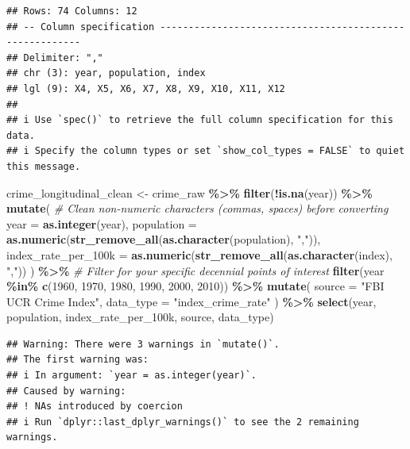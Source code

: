\documentclass[
]{article}
\newenvironment{Shaded}{\begin{snugshade}}{\end{snugshade}}
\newcommand{\AttributeTok}[1]{\textcolor[rgb]{0.13,0.29,0.53}{#1}}
\newcommand{\CommentTok}[1]{\textcolor[rgb]{0.56,0.35,0.01}{\textit{#1}}}
\newcommand{\DecValTok}[1]{\textcolor[rgb]{0.00,0.00,0.81}{#1}}
\newcommand{\FunctionTok}[1]{\textcolor[rgb]{0.13,0.29,0.53}{\textbf{#1}}}
\newcommand{\NormalTok}[1]{#1}
\newcommand{\OtherTok}[1]{\textcolor[rgb]{0.56,0.35,0.01}{#1}}
\newcommand{\SpecialCharTok}[1]{\textcolor[rgb]{0.81,0.36,0.00}{\textbf{#1}}}
\newcommand{\StringTok}[1]{\textcolor[rgb]{0.31,0.60,0.02}{#1}}
\begin{document}
\begin{verbatim}
## Rows: 74 Columns: 12
## -- Column specification --------------------------------------------------------
## Delimiter: ","
## chr (3): year, population, index
## lgl (9): X4, X5, X6, X7, X8, X9, X10, X11, X12
## 
## i Use `spec()` to retrieve the full column specification for this data.
## i Specify the column types or set `show_col_types = FALSE` to quiet this message.
\end{verbatim}

\begin{Shaded}
\begin{Highlighting}[]
\NormalTok{crime\_longitudinal\_clean }\OtherTok{\textless{}{-}}\NormalTok{ crime\_raw }\SpecialCharTok{\%\textgreater{}\%}
  \FunctionTok{filter}\NormalTok{(}\SpecialCharTok{!}\FunctionTok{is.na}\NormalTok{(year)) }\SpecialCharTok{\%\textgreater{}\%}
  \FunctionTok{mutate}\NormalTok{(}
    \CommentTok{\# Clean non{-}numeric characters (commas, spaces) before converting}
    \AttributeTok{year =} \FunctionTok{as.integer}\NormalTok{(year),}
    \AttributeTok{population =} \FunctionTok{as.numeric}\NormalTok{(}\FunctionTok{str\_remove\_all}\NormalTok{(}\FunctionTok{as.character}\NormalTok{(population), }\StringTok{","}\NormalTok{)),}
    \AttributeTok{index\_rate\_per\_100k =} \FunctionTok{as.numeric}\NormalTok{(}\FunctionTok{str\_remove\_all}\NormalTok{(}\FunctionTok{as.character}\NormalTok{(index), }\StringTok{","}\NormalTok{))}
\NormalTok{  ) }\SpecialCharTok{\%\textgreater{}\%}
  \CommentTok{\# Filter for your specific decennial points of interest}
  \FunctionTok{filter}\NormalTok{(year }\SpecialCharTok{\%in\%} \FunctionTok{c}\NormalTok{(}\DecValTok{1960}\NormalTok{, }\DecValTok{1970}\NormalTok{, }\DecValTok{1980}\NormalTok{, }\DecValTok{1990}\NormalTok{, }\DecValTok{2000}\NormalTok{, }\DecValTok{2010}\NormalTok{)) }\SpecialCharTok{\%\textgreater{}\%}
  \FunctionTok{mutate}\NormalTok{(}
    \AttributeTok{source =} \StringTok{"FBI UCR Crime Index"}\NormalTok{,}
    \AttributeTok{data\_type =} \StringTok{"index\_crime\_rate"}
\NormalTok{  ) }\SpecialCharTok{\%\textgreater{}\%}
  \FunctionTok{select}\NormalTok{(year, population, index\_rate\_per\_100k, source, data\_type)}
\end{Highlighting}
\end{Shaded}

\begin{verbatim}
## Warning: There were 3 warnings in `mutate()`.
## The first warning was:
## i In argument: `year = as.integer(year)`.
## Caused by warning:
## ! NAs introduced by coercion
## i Run `dplyr::last_dplyr_warnings()` to see the 2 remaining warnings.
\end{verbatim}
\end{document}

